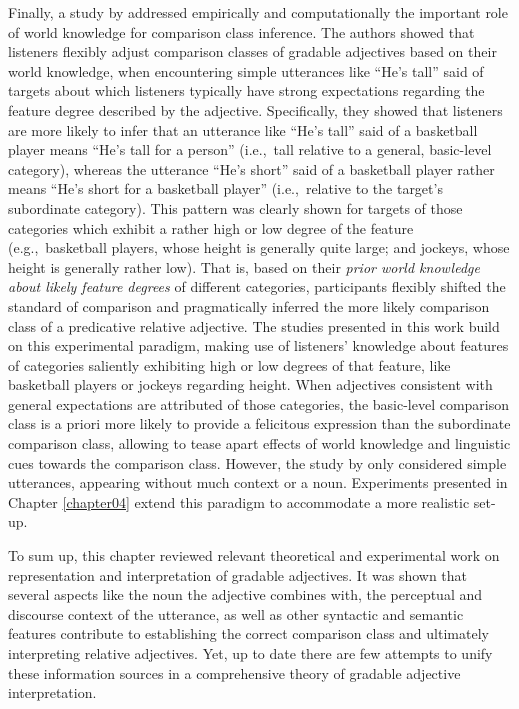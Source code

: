 Finally, a study by \textcite{tessler2017warm} addressed empirically and computationally the important role of world knowledge for comparison class inference. The authors showed that listeners flexibly adjust comparison classes of gradable adjectives based on their world knowledge, when encountering simple utterances like “He’s tall” said of targets about which listeners typically have strong expectations regarding the feature degree described by the adjective. Specifically, they showed that listeners are more likely to infer that an utterance like “He’s tall” said of a basketball player means “He’s tall for a person” (i.e.,~tall relative to a general, basic-level category), whereas the utterance “He’s short” said of a basketball player rather means “He’s short for a basketball player” (i.e.,~relative to the target’s subordinate category). This pattern was clearly shown for targets of those categories which exhibit a rather high or low degree of the feature (e.g.,~basketball players, whose height is generally quite large; and jockeys, whose height is generally rather low). That is, based on their \emph{prior world knowledge about likely feature degrees} of different categories, participants flexibly shifted the standard of comparison and pragmatically inferred the more likely comparison class of a predicative relative adjective. 
The studies presented in this work build on this experimental paradigm, making use of listeners’ knowledge about features of categories saliently exhibiting high or low degrees of that feature, like basketball players or jockeys regarding height. When adjectives consistent with general expectations are attributed of those categories, the basic-level comparison class is a priori more likely to provide a felicitous expression than the subordinate comparison class, allowing to tease apart effects of world knowledge and linguistic cues towards the comparison class. 
However, the study by \textcite{tessler2017warm} only considered simple utterances, appearing without much context or a noun. Experiments presented in Chapter \ref{chapter04} extend this paradigm to accommodate a more realistic set-up. 

To sum up, this chapter reviewed relevant theoretical and experimental work on representation and interpretation of gradable adjectives. It was shown that several aspects like the noun the adjective combines with, the perceptual and discourse context of the utterance, as well as other syntactic and semantic features contribute to establishing the correct comparison class and ultimately interpreting relative adjectives. Yet, up to date there are few attempts to unify these information sources in a comprehensive theory of gradable adjective interpretation.  